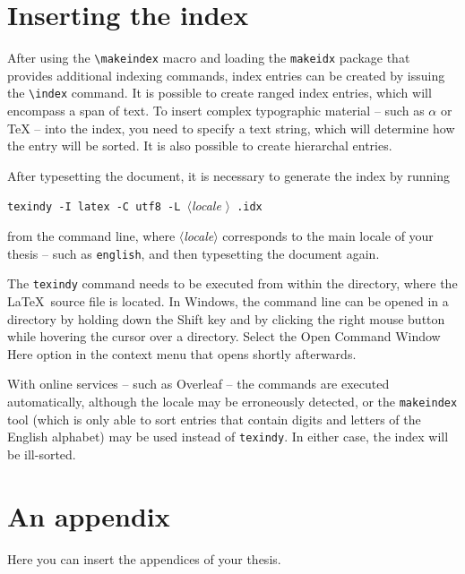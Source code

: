 \documentclass[
  digital, %
  table,   %
  lof,     %
  lot,     %
]{fithesis3}
\begin{document}
  \printbibliography[heading=bibintoc] %

\chapter{Inserting the index}
After using the \verb"\makeindex" macro and loading the
\texttt{makeidx} package that provides additional indexing
commands, index entries can be created by issuing the \verb"\index"
command. It is possible to create ranged index
entries, which will encompass a span of text.
To insert complex typographic material -- such as $\alpha$
 or \TeX{}  --
into the index, you need to specify a text string, which will
determine how the entry will be sorted. It is also possible to
create hierarchal entries. 

After typesetting the document, it is necessary to generate the
index by running
\begin{center}%
  \texttt{texindy -I latex -C utf8 -L }$\langle$\textit{locale}%
  $\rangle$\texttt{ \jobname.idx}
\end{center}
from the command line, where $\langle$\textit{locale}$\rangle$
corresponds to the main locale of your thesis -- such as
\texttt{english}, and then typesetting the document again.

The \texttt{texindy} command needs to be executed from within the
directory, where the \LaTeX\ source file is located. In Windows,
the command line can be opened in a directory by holding down the
\textsf{Shift} key and by clicking the right mouse button while
hovering the cursor over a directory. Select the \textsf{Open Command
Window Here} option in the context menu that opens shortly
afterwards.

With online services -- such as Overleaf -- the commands are
executed automatically, although the locale may be erroneously
detected, or the \texttt{makeindex} tool (which is only able to
sort entries that contain digits and letters of the English
alphabet) may be used instead of \texttt{texindy}. In either case,
the index will be ill-sorted.

  \makeatletter\thesis@blocks@clear\makeatother
  \printindex

\appendix %
\chapter{An appendix}
Here you can insert the appendices of your thesis.
\end{document}
